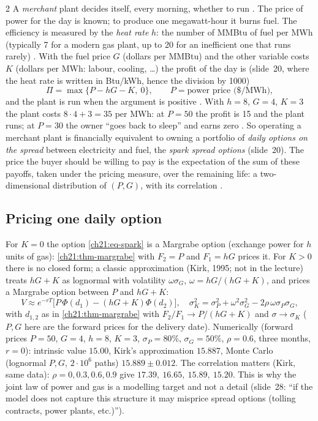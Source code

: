 \begin{paracol}{2}
A \emph{merchant} plant decides itself, every morning, whether to run . The price of power for the day is known; to produce one megawatt-hour it burns fuel. The efficiency is measured by the \emph{heat rate} $h$:
the number of MMBtu of fuel per MWh (typically 7 for a modern gas plant, up to 20 for an inefficient one that runs rarely) . With the fuel price $G$ (dollars per MMBtu) and the other variable costs $K$ (dollars per MWh: labour, cooling, \dots)
the profit of the day is (slide~20, where the heat rate is written in Btu/kWh, hence the division by 1000)
\begin{equation}\label{ch21:eq-spark}
  \Pi=\max\bigl\{P-hG-K,\ 0\bigr\},\qquad P=\text{power price (\$/MWh)},
\end{equation}
and the plant is run when the argument is positive . With $h=8$, $G=4$, $K=3$ the plant costs $8\cdot4+3=35$ per MWh: at $P=50$ the profit is 15 and the plant runs; at $P=30$ the owner ``goes back to sleep'' and earns zero
. So operating a merchant plant is financially equivalent to owning a portfolio of \emph{daily options on the spread} between electricity and fuel, the \emph{spark spread options} (slide~20).
The price the buyer should be willing to pay is the expectation of the sum of these payoffs, taken under the pricing measure, over the remaining life: a two-dimensional distribution of $(P,G)$, with its correlation .

\subsection{Pricing one daily option}
For $K=0$ the option \eqref{ch21:eq-spark} is a Margrabe option (exchange power for $h$ units of gas): \cref{ch21:thm-margrabe} with $F_2=P$ and $F_1=hG$ prices it. For $K>0$ there is no closed form; a classic approximation (Kirk, 1995; not in the lecture) treats
$hG+K$ as lognormal with volatility $\omega\sigma_G$, $\omega=hG/(hG+K)$, and prices a Margrabe option between $P$ and $hG+K$:
\begin{equation}\label{ch21:eq-kirk}
  V\approx e^{-rT}\bigl[P\,\Phi(d_1)-(hG+K)\Phi(d_2)\bigr],\quad
  \sigma_K^2=\sigma_P^2+\omega^2\sigma_G^2-2\rho\,\omega\sigma_P\sigma_G,
\end{equation}
with $d_{1,2}$ as in \cref{ch21:thm-margrabe} with $F_2/F_1\to P/(hG+K)$ and $\sigma\to\sigma_K$ ($P,G$ here are the forward prices for the delivery date). Numerically (forward prices $P=50$, $G=4$, $h=8$, $K=3$, $\sigma_P=80\%$, $\sigma_G=50\%$, $\rho=0.6$,
three months, $r=0$): intrinsic value $15.00$, Kirk's approximation $15.887$, Monte Carlo (lognormal $P,G$, $2\cdot10^6$ paths) $15.889\pm0.012$. The correlation matters (Kirk, same data): $\rho=0,0.3,0.6,0.9$ give $17.39,\ 16.65,\ 15.89,\ 15.20$. This is why the joint law of power and
gas is a modelling target and not a detail (slide~28: ``if the model does not capture this structure it may misprice spread options (tolling contracts, power plants, etc.)'').


\end{paracol}

